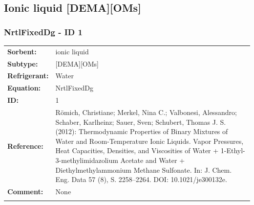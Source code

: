 \subsection{Ionic liquid [DEMA][OMs]}
%
\subsubsection{NrtlFixedDg - ID 1}
%
\begin{tabular}[l]{|lp{11.5cm}|}
\hline
\addlinespace

\textbf{Sorbent:} & ionic liquid \\
\textbf{Subtype:} & [DEMA][OMs] \\
\textbf{Refrigerant:} & Water \\
\textbf{Equation:} & NrtlFixedDg \\
\textbf{ID:} & 1 \\
\textbf{Reference:} & Römich, Christiane; Merkel, Nina C.; Valbonesi, Alessandro; Schaber, Karlheinz; Sauer, Sven; Schubert, Thomas J. S. (2012): Thermodynamic Properties of Binary Mixtures of Water and Room-Temperature Ionic Liquids. Vapor Pressures, Heat Capacities, Densities, and Viscosities of Water + 1-Ethyl-3-methylimidazolium Acetate and Water + Diethylmethylammonium Methane Sulfonate. In: J. Chem. Eng. Data 57 (8), S. 2258–2264. DOI: 10.1021/je300132e. \\
\textbf{Comment:} & None \\

\addlinespace
\hline
\end{tabular}
\newline

